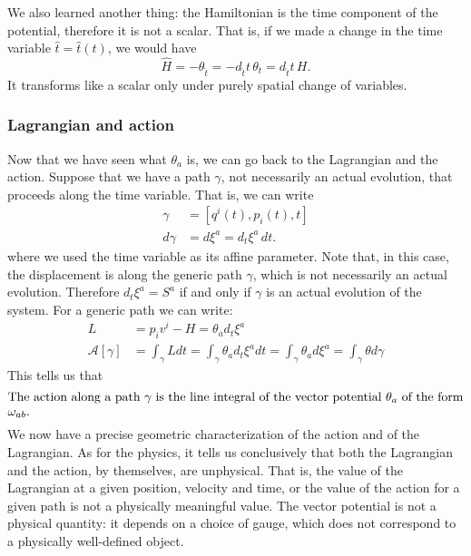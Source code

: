We also learned another thing: the Hamiltonian is the time component of the potential, therefore it is not a scalar. That is, if we made a change in the time variable $\hat{t} = \hat{t}(t)$, we would have
\begin{equation}\label{rp-cm-energyTimeComponent}
	\hat{H} = - \theta_{\hat{t}} = - d_{\hat{t}} t \,  \theta_t = d_{\hat{t}} t \, H.
\end{equation}
It transforms like a scalar only under purely spatial change of variables.

\subsubsection{Lagrangian and action}

Now that we have seen what $\theta_a$ is, we can go back to the Lagrangian and the action. Suppose that we have a path $\gamma$, not necessarily an actual evolution, that proceeds along the time variable. That is, we can write
\begin{equation}
	\begin{aligned}
		\gamma &= [q^i(t), p_i(t), t] \\
		d\gamma &= d \xi^a = d_t \xi^a \, dt.
	\end{aligned}
\end{equation}
where we used the time variable as its affine parameter. Note that, in this case, the displacement is along the generic path $\gamma$, which is not necessarily an actual evolution. Therefore $d_t \xi^a = S^a$ if and only if $\gamma$ is an actual evolution of the system. For a generic path we can write:
\begin{equation}
	\begin{aligned}
		L &= p_i v^i - H = \theta_a d_t \xi^a \\
		\mathcal{A}[\gamma] &= \int_\gamma L dt =  \int_\gamma \theta_a d_t \xi^a dt = \int_\gamma \theta_a d \xi^a = \int_\gamma \theta d\gamma
	\end{aligned}
\end{equation}
This tells us that
\begin{equation}
	\parbox{5in}{The action along a path $\gamma$ is the line integral of the vector potential $\theta_a$ of the form $\omega_{ab}$.}
\end{equation} 
We now have a precise geometric characterization of the action and of the Lagrangian. As for the physics, it tells us conclusively that both the Lagrangian and the action, by themselves, are unphysical. That is, the value of the Lagrangian at a given position, velocity and time, or the value of the action for a given path is not a physically meaningful value. The vector potential is not a physical quantity: it depends on a choice of gauge, which does not correspond to a physically well-defined object.

